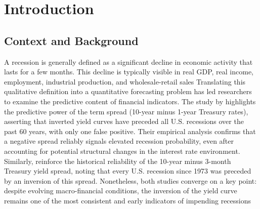 
\section{Introduction}



\begin{comment}
\begin{itemize}

    \item \hlgreen{Problem Statement: Clearly define the problem your project addresses.}
    \item \hlgreen{Objectives: Outline the goals of the project (what you aimed to achieve).}
    \item \hlgreen{Research Questions or Hypothesis: State the key questions or hypotheses that guide your research.}

\end{itemize}
\end{comment}





    


\subsection{Context and Background}
A recession is generally defined as a significant decline in economic activity that lasts for a few months. This decline is typically visible in real GDP, real income, employment, industrial production, and wholesale-retail sales \parencite{NBERRecession} Translating this qualitative definition into a quantitative forecasting problem has led researchers to examine the predictive content of financial indicators. The study by \textcite{bauer2018economic} highlights the predictive power of the term spread (10-year minus 1-year Treasury rates), asserting that inverted yield curves have preceded all U.S. recessions over the past 60 years, with only one false positive. Their empirical analysis confirms that a negative spread reliably signals elevated recession probability, even after accounting for potential structural changes in the interest rate environment. Similarly, \textcite{aramonte2019yield} reinforce the historical reliability of the 10-year minus 3-month Treasury yield spread, noting that every U.S. recession since 1973 was preceded by an inversion of this spread. Nonetheless, both studies converge on a key point: despite evolving macro-financial conditions, the inversion of the yield curve remains one of the most consistent and early indicators of impending recessions \parencite{aramonte2019yield,bauer2018economic}

